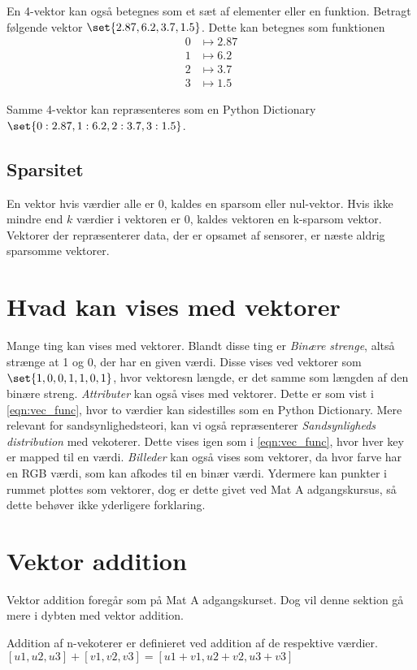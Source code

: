 En 4-vektor kan også betegnes som et sæt af elementer eller en funktion. Betragt følgende vektor $\set{2.87,6.2,3.7,1.5}$. Dette kan betegnes som funktionen
\begin{align}
	\label{eqn:vec_func}
	0&\mapsto 2.87\\
	1&\mapsto 6.2\\
	2&\mapsto 3.7\\
	3&\mapsto 1.5
\end{align}

Samme 4-vektor kan repræsenteres som en Python Dictionary $\set{0:2.87, 1:6.2, 2:3.7, 3:1.5}$.

\subsection{Sparsitet}
En vektor hvis værdier alle er 0, kaldes en sparsom eller nul-vektor. Hvis ikke mindre end $k$ værdier i vektoren er 0, kaldes vektoren en k-sparsom vektor. Vektorer der repræsenterer data, der er opsamet af sensorer, er næste aldrig sparsomme vektorer.

\section{Hvad kan vises med vektorer}
Mange ting kan vises med vektorer. Blandt disse ting er \emph{Binære strenge}, altså strænge at 1 og 0, der har en given værdi. Disse vises ved vektorer som $\set{1,0,0,1,1,0,1}$, hvor vektoresn længde, er det samme som længden af den binære streng. \emph{Attributer} kan også vises med vektorer. Dette er som vist i \cref{eqn:vec_func}, hvor to værdier kan sidestilles som en Python Dictionary. Mere relevant for sandsynlighedsteori, kan vi også repræsenterer \emph{Sandsynligheds distribution} med vekoterer. Dette vises igen som i \cref{eqn:vec_func}, hvor hver key er mapped til en værdi. \emph{Billeder} kan også vises som vektorer, da hvor farve har en RGB værdi, som kan afkodes til en binær værdi. Ydermere kan punkter i rummet plottes som vektorer, dog er dette givet ved Mat A adgangskursus, så dette behøver ikke yderligere forklaring.

\section{Vektor addition}
Vektor addition foregår som på Mat A adgangskurset. Dog vil denne sektion gå mere i dybten med vektor addition. 

\begin{frdef}[KLEIN s. 69]
	Addition af n-vekoterer er definieret ved addition af de respektive værdier.
	$[u1,u2,u3] + [v1,v2,v3] = [u1+v1, u2+v2, u3+v3]$
\end{frdef}

